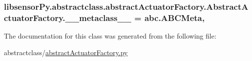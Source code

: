 \subsubsection[{\+\_\+\+\_\+metaclass\+\_\+\+\_\+}]{\setlength{\rightskip}{0pt plus 5cm}libsensor\+Py.\+abstractclass.\+abstract\+Actuator\+Factory.\+Abstract\+Actuator\+Factory.\+\_\+\+\_\+metaclass\+\_\+\+\_\+ = abc.\+A\+B\+C\+Meta\hspace{0.3cm}{\ttfamily [static]}, {\ttfamily [private]}}\label{classlibsensorPy_1_1abstractclass_1_1abstractActuatorFactory_1_1AbstractActuatorFactory_a38afed7ed9068df3a37174cb85e96929}


The documentation for this class was generated from the following file\+:\begin{DoxyCompactItemize}
\item 
abstractclass/\hyperlink{abstractActuatorFactory_8py}{abstract\+Actuator\+Factory.\+py}\end{DoxyCompactItemize}
